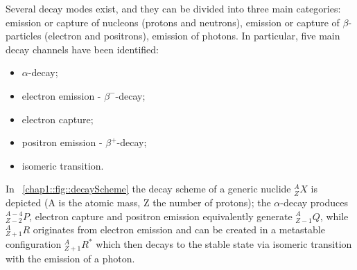 Several decay modes exist, and they can be divided into three main categories: emission or capture of nucleons (protons and neutrons), emission or capture of $\beta$-particles (electron and positrons), emission of photons. In particular, five main decay channels have been identified:
\begin{itemize}
\item $\alpha$-decay;
\item electron emission - $\beta^-$-decay;
\item electron capture;
\item positron emission - $\beta^+$-decay;
\item isomeric transition.
\end{itemize}
In \figurename~\ref{chap1::fig::decayScheme} the decay scheme of a generic nuclide $^{A}_{Z}X$ is depicted (A is the atomic mass, Z the number of protons); the $\alpha$-decay produces $^{A-4}_{Z-2}P$, electron capture and positron emission equivalently generate $^{A}_{Z-1}Q$, while $^{A}_{Z+1}R$ originates from electron emission and can be created in a metastable configuration $^{A}_{Z+1}R^*$ which then decays to the stable state via isomeric transition with the emission of a photon.  

